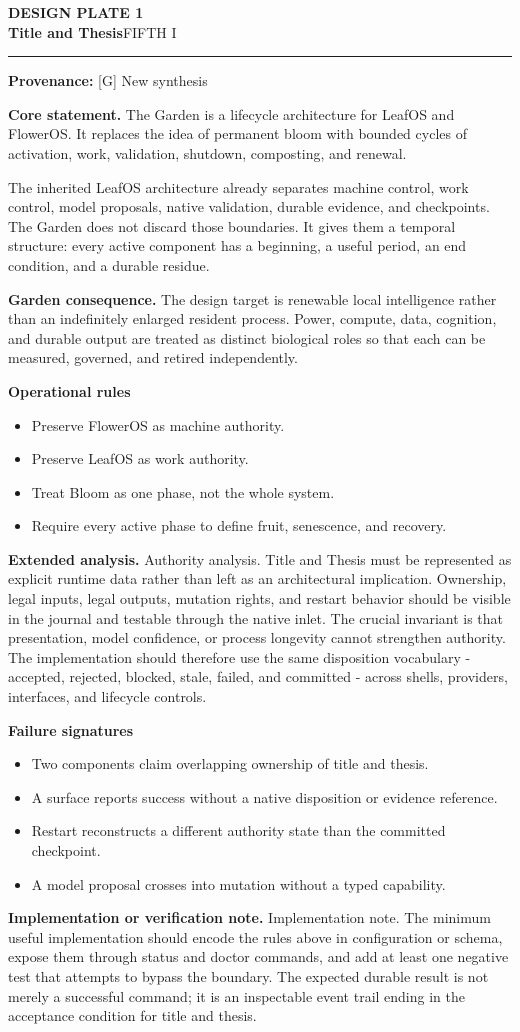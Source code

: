 \documentclass[10pt,letterpaper,oneside]{article}
\newcommand{\prov}[1]{\textcolor{gardenBlue}{\sffamily\footnotesize\textbf{Provenance:} #1}}
\newcommand{\platetitle}[3]{%
  \begin{minipage}[t][0.54in][t]{\textwidth}
  {\sffamily\bfseries\color{gardenDeep}\fontsize{9}{10}\selectfont DESIGN PLATE #1}\\[-1pt]
  {\sffamily\bfseries\color{gardenInk}\fontsize{16.5}{18}\selectfont #2}\hfill{\sffamily\color{gardenGreen}\large #3}
  \end{minipage}\vspace{-2pt}\hrule\vspace{5pt}}
\begin{document}
\platetitle{1}{Title and Thesis}{FIFTH I}
\prov{[G] New synthesis}
\fontsize{8.85}{10.45}\selectfont
\begin{corebox}
\textbf{Core statement.} The Garden is a lifecycle architecture for LeafOS and FlowerOS. It replaces the idea of permanent bloom with bounded cycles of activation, work, validation, shutdown, composting, and renewal.
\end{corebox}
The inherited LeafOS architecture already separates machine control, work control, model proposals, native validation, durable evidence, and checkpoints. The Garden does not discard those boundaries. It gives them a temporal structure: every active component has a beginning, a useful period, an end condition, and a durable residue.

\textbf{Garden consequence.} The design target is renewable local intelligence rather than an indefinitely enlarged resident process. Power, compute, data, cognition, and durable output are treated as distinct biological roles so that each can be measured, governed, and retired independently.

\textbf{Operational rules}
\begin{itemize}
\item Preserve FlowerOS as machine authority.
\item Preserve LeafOS as work authority.
\item Treat Bloom as one phase, not the whole system.
\item Require every active phase to define fruit, senescence, and recovery.
\end{itemize}
\textbf{Extended analysis.} Authority analysis. Title and Thesis must be represented as explicit runtime data rather than left as an architectural implication. Ownership, legal inputs, legal outputs, mutation rights, and restart behavior should be visible in the journal and testable through the native inlet. The crucial invariant is that presentation, model confidence, or process longevity cannot strengthen authority. The implementation should therefore use the same disposition vocabulary - accepted, rejected, blocked, stale, failed, and committed - across shells, providers, interfaces, and lifecycle controls.

\textbf{Failure signatures}
\begin{itemize}
\item Two components claim overlapping ownership of title and thesis.
\item A surface reports success without a native disposition or evidence reference.
\item Restart reconstructs a different authority state than the committed checkpoint.
\item A model proposal crosses into mutation without a typed capability.
\end{itemize}
\textbf{Implementation or verification note.} Implementation note. The minimum useful implementation should encode the rules above in configuration or schema, expose them through status and doctor commands, and add at least one negative test that attempts to bypass the boundary. The expected durable result is not merely a successful command; it is an inspectable event trail ending in the acceptance condition for title and thesis.
\end{document}
